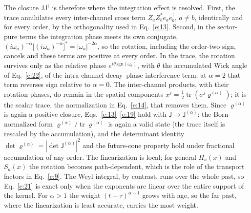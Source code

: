 \documentclass[10pt]{article}
\newcommand{\sJ}{\mathsf{J}}
\newcommand{\tr}{\operatorname{tr}}
\begin{document}
The closure $\sJ\sJ^\dagger$ is therefore where the integration effect is resolved. First, the trace annihilates every inter-channel cross term $Z_aZ_b^*e_ae_b^\dagger$, $a\ne b$, identically and for every order, by the orthogonality used in Eq.~\eqref{e:13}. Second, in the sector-pure terms the integration phase meets its own conjugate, $(i\omega_a)^{-\alpha}\bigl[(i\omega_a)^{-\alpha}\bigr]^*=|\omega_a|^{-2\alpha}$, so the rotation, including the order-two sign, cancels and these terms are positive at every order. In the trace, the rotation survives only as the relative phase $e^{i\theta\,\mathrm{sgn}(\omega_a)}$, with $\theta$ the accumulated Wick angle of Eq.~\eqref{e:22}, of the intra-channel decay--phase interference term; at $\alpha=2$ that term reverses sign relative to $\alpha=0$. The inter-channel products, with their rotation phases, do remain in the spatial components $x^j=\frac12\tr(\sigma^j\varrho^{(\alpha)})$; it is the scalar trace, the normalization in Eq.~\eqref{e:14}, that removes them. Since $\varrho^{(\alpha)}$ is again a positive closure, Eqs.~\eqref{e:13}--\eqref{e:19} hold with $\sJ\to\sJ^{(\alpha)}$: the Born-normalized form $\varrho^{(\alpha)}/\tr\varrho^{(\alpha)}$ is again a valid state (the trace itself is rescaled by the accumulation), and the determinant identity $\det\varrho^{(\alpha)}=|\det\sJ^{(\alpha)}|^2$ and the future-cone property hold under fractional accumulation of any order. The linearization is local; for general $H_a(x)$ and $S_a(x)$ the rotation becomes path-dependent, which is the role of the transport factors in Eq.~\eqref{e:9}. The Weyl integral, by contrast, runs over the whole past, so Eq.~\eqref{e:21} is exact only when the exponents are linear over the entire support of the kernel. For $\alpha>1$ the weight $(t-\tau)^{\alpha-1}$ grows with age, so the far past, where the linearization is least accurate, carries the most weight.
\end{document}
